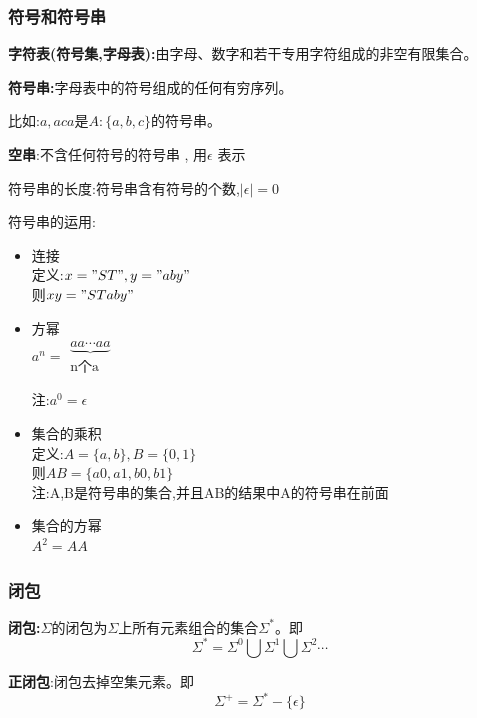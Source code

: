 \subsubsection{符号和符号串}
\textbf{字符表(符号集,字母表):}由字母、数字和若干专用字符组成的非空有限集合。

\textbf{符号串:}字母表中的符号组成的任何有穷序列。

比如:$a,aca$是$A:\{a,b,c\}$的符号串。

\textbf{空串}:不含任何符号的符号串 , 用$\epsilon$ 表示

符号串的长度:符号串含有符号的个数,$|\epsilon| = 0$

符号串的运用:
\begin{itemize}
 \item 连接\\
       定义:$x = "ST", y = "aby"$\\
       则$xy = "STaby"$

 \item 方幂\\
       $a^n = \begin{array}{c}\underbrace{aa\cdots aa}\\ \text{n个a} \end{array}$

       注:$a^0 = \epsilon$

 \item 集合的乘积\\
       定义:$A = \{a,b\} , B = \{0 ,1\}$\\
       则$AB = \{a0 , a1 , b0 , b1\}$\\
       注:A,B是符号串的集合,并且AB的结果中A的符号串在前面

 \item 集合的方幂\\
       $A^2 = AA$
\end{itemize}

\subsubsection{闭包}
\textbf{闭包:}$\Sigma$的闭包为$\Sigma$上所有元素组合的集合$\Sigma^*$。即
\begin{equation}
 \Sigma^* = \Sigma^0 \bigcup \Sigma^1 \bigcup \Sigma^2 \cdots
\end{equation}

\textbf{正闭包}:闭包去掉空集元素。即
\begin{equation}
 \Sigma^+ = \Sigma^* - \{\epsilon\}
\end{equation}


